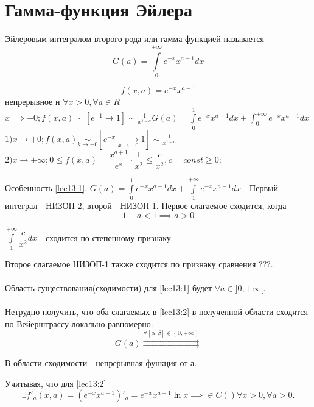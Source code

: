 \documentclass[../../main.tex]{subfiles}
\begin{document}

\section{Гамма-функция Эйлера}

Эйлеровым интегралом второго рода или гамма-функцией называется
\begin{equation}
\label{lec13:1}
G(a) = \int\limits_0^{+\infty}e^{-x}x^{a-1}dx
\end{equation}

\[
	f(x, a) = e^{-x}x^{a-1}
\]  непрерывное н $\forall x > 0, \forall a \in R$
\\
$
	x \implies +0; f(x, a) \sim [e^{-1} \to 1] \sim \frac{1}{x^{1-a}}
	G(a) = \int\limits_0^1e^{-x}x^{a-1}dx + \int_0^{+\infty}e^{-x}x^{a-1}dx
$
\\
$
1) x \to + 0; f(x, a) \underset{k \to +0}\sim \left[ e^{-x} \underset{x \to +0} \to 1 \right] \sim \frac{1}{x^{1-a}}
$
\\
$
	2) x \to +\infty; 
	0 \le f(x, a) = \dfrac{x^{a+1}}{e^x} \cdot \dfrac{1}{x^2} \le \dfrac{c}{x^2}, c=const \ge 0;
$

Особенность \eqref{lec13:1}, $G(a) = \int\limits_0^1 e^{-x} x^{a-1} dx +\int\limits_1^{+\infty} e^{-x} x^{a-1} dx $ - Первый интеграл - НИЗОП-2, второй - НИЗОП-1. Первое слагаемое сходится, когда \begin{equation}
	\label{lec13:2}
	1 - a < 1 \implies a > 0
\end{equation}

$\int\limits_1^{+\infty}\dfrac{c}{x^2}dx$ - сходится по степенному признаку.

Второе слагаемое НИЗОП-1 также сходится по признаку сравнения ???.
\\\\
Область существования(сходимости) для \eqref{lec13:1} будет $\forall a \in ]0, +\infty[$.
\\\\
Нетрудно получить, что оба слагаемых в \eqref{lec13:2} в полученной области сходятся по Вейерштрассу локально равномерно:
\[
G(a) \overset{\forall \left[ \alpha, \beta \right] \in (0, +\infty)}{\rightrightarrows}
\]

В области сходимости - непрерывная функция от а.

Учитывая, что для \eqref{lec13:2}
\[
\exists f'_a(x, a) = (e^{-x} x^{a-1})'_a = e^{-x}x^{a-1} \ln x \implies \in C() \forall x > 0, \forall a > 0.
\]
\end{document}
